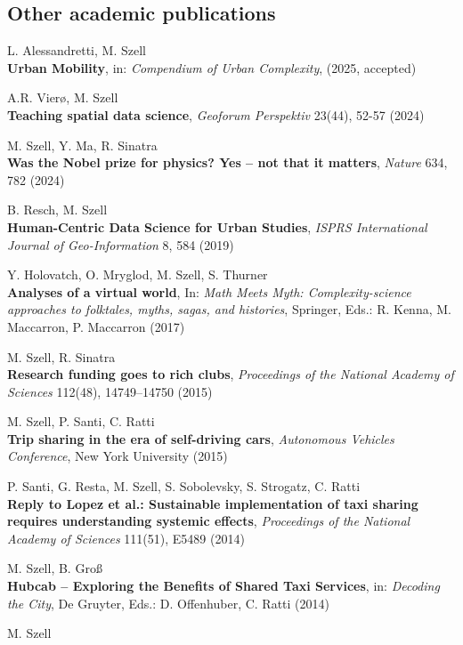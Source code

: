 \documentclass[10pt,a4paper]{article}
\renewenvironment{itemize}{
  \begin{list}{}{
    \setlength{\leftmargin}{1.5em}
    \setlength{\itemsep}{0.25em}
    \setlength{\parskip}{0pt}
    \setlength{\parsep}{0.25em}
  }
}{
  \end{list}
}
\begin{document}
\subsection*{Other academic publications}
\begin{itemize}
\setlength\itemsep{1em}
\item L. Alessandretti, M. Szell\\
    \textbf{Urban Mobility}, in: \textit{Compendium of Urban Complexity}, (2025, accepted)
\item A.R. Vierø, M. Szell\\
\textbf{Teaching spatial data science}, \textit{Geoforum Perspektiv} 23(44), 52-57 (2024)
\item M. Szell, Y. Ma, R. Sinatra\\
    \textbf{Was the Nobel prize for physics? Yes -- not that it matters}, \textit{Nature} 634, 782 (2024)
\item B. Resch, M. Szell\\
    \textbf{Human-Centric Data Science for Urban Studies}, \textit{ISPRS International Journal of Geo-Information}  8, 584 (2019)
\item Y. Holovatch, O. Mryglod, M. Szell, S. Thurner\\
    \textbf{Analyses of a virtual world}, In: \textit{Math Meets Myth: Complexity-science approaches to folktales, myths, sagas, and histories}, Springer, Eds.: R. Kenna, M. Maccarron, P. Maccarron (2017)
\item M. Szell, R. Sinatra\\
    \textbf{Research funding goes to rich clubs}, \textit{Proceedings of the National Academy of Sciences} 112(48), 14749--14750 (2015)    
\item M. Szell, P. Santi, C. Ratti\\
\textbf{Trip sharing in the era of self-driving cars}, \textit{Autonomous Vehicles Conference}, New York University (2015)
\item P. Santi, G. Resta, M. Szell, S. Sobolevsky, S. Strogatz, C. Ratti\\
    \textbf{Reply to Lopez et al.: Sustainable implementation of taxi sharing requires understanding systemic effects}, \textit{Proceedings of the National Academy of Sciences} 111(51), E5489 (2014)
\item M. Szell, B. Gro{\ss}\\
    \textbf{Hubcab -- Exploring the Benefits of Shared Taxi Services}, in: \textit{Decoding the City}, De Gruyter, Eds.: D. Offenhuber, C. Ratti (2014)
\item M. Szell\\

\end{itemize}
\end{document}

